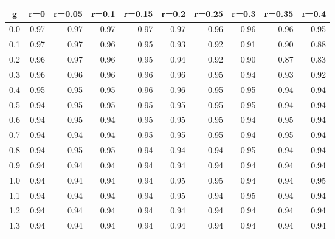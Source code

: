 %
\begin{table}[!tbp]
 \begin{center}
 \begin{tabular}{rrrrrrrrrr}\hline\hline
\multicolumn{1}{c}{g}&\multicolumn{1}{c}{r=0}&\multicolumn{1}{c}{r=0.05}&\multicolumn{1}{c}{r=0.1}&\multicolumn{1}{c}{r=0.15}&\multicolumn{1}{c}{r=0.2}&\multicolumn{1}{c}{r=0.25}&\multicolumn{1}{c}{r=0.3}&\multicolumn{1}{c}{r=0.35}&\multicolumn{1}{c}{r=0.4}\tabularnewline
\hline
0.0&0.97&0.97&0.97&0.97&0.97&0.96&0.96&0.96&0.95\tabularnewline
0.1&0.97&0.97&0.96&0.95&0.93&0.92&0.91&0.90&0.88\tabularnewline
0.2&0.96&0.97&0.96&0.95&0.94&0.92&0.90&0.87&0.83\tabularnewline
0.3&0.96&0.96&0.96&0.96&0.96&0.95&0.94&0.93&0.92\tabularnewline
0.4&0.95&0.95&0.95&0.96&0.96&0.95&0.95&0.94&0.94\tabularnewline
0.5&0.94&0.95&0.95&0.95&0.95&0.95&0.95&0.94&0.94\tabularnewline
0.6&0.94&0.95&0.94&0.95&0.95&0.95&0.94&0.95&0.94\tabularnewline
0.7&0.94&0.94&0.94&0.95&0.95&0.95&0.94&0.95&0.94\tabularnewline
0.8&0.94&0.95&0.95&0.94&0.94&0.94&0.95&0.94&0.94\tabularnewline
0.9&0.94&0.94&0.94&0.94&0.94&0.94&0.94&0.94&0.94\tabularnewline
1.0&0.94&0.94&0.94&0.94&0.95&0.95&0.94&0.94&0.95\tabularnewline
1.1&0.94&0.94&0.94&0.94&0.95&0.94&0.95&0.94&0.94\tabularnewline
1.2&0.94&0.94&0.94&0.94&0.94&0.94&0.94&0.94&0.94\tabularnewline
1.3&0.94&0.94&0.94&0.94&0.94&0.94&0.94&0.94&0.94\tabularnewline
\hline
\end{tabular}

\end{center}

\end{table}


